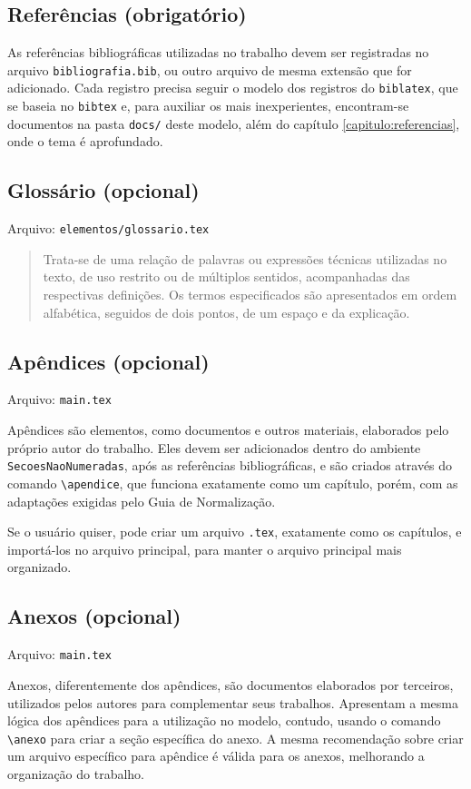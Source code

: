 \subsection{Referências (obrigatório)}
    As referências bibliográficas utilizadas no trabalho devem ser registradas no arquivo \texttt{bibliografia.bib}, ou outro arquivo de mesma extensão que for adicionado. Cada registro precisa seguir o modelo dos registros do \texttt{biblatex}, que se baseia no \texttt{bibtex} e, para auxiliar os mais inexperientes, encontram-se documentos na pasta \texttt{docs/} deste modelo, além do capítulo \ref{capitulo:referencias}, onde o tema é aprofundado.

\subsection{Glossário (opcional)}
    Arquivo: \texttt{elementos/glossario.tex}
    
    \blockcquote[p. 33]{livro:iffar-guia-normalizacao-2022}{Trata-se de uma relação de palavras ou expressões técnicas utilizadas no texto, de uso restrito ou de múltiplos sentidos, acompanhadas das respectivas definições. Os termos especificados são apresentados em ordem alfabética, seguidos de dois pontos, de um espaço e da
    explicação.}

\subsection{Apêndices (opcional)}
    Arquivo: \texttt{main.tex}
    
    Apêndices são elementos, como documentos e outros materiais, elaborados pelo próprio autor do trabalho. Eles devem ser adicionados dentro do ambiente \texttt{SecoesNaoNumeradas}, após as referências bibliográficas, e são criados através do comando \verb|\apendice|, que funciona exatamente como um capítulo, porém, com as adaptações exigidas pelo Guia de Normalização.

    Se o usuário quiser, pode criar um arquivo \texttt{.tex}, exatamente como os capítulos, e importá-los no arquivo principal, para manter o arquivo principal mais organizado.

\subsection{Anexos (opcional)}
    Arquivo: \texttt{main.tex}
    
    Anexos, diferentemente dos apêndices, são documentos elaborados por terceiros, utilizados pelos autores para complementar seus trabalhos. Apresentam a mesma lógica dos apêndices para a utilização no modelo, contudo, usando o comando \verb|\anexo| para criar a seção específica do anexo. A mesma recomendação sobre criar um arquivo específico para apêndice é válida para os anexos, melhorando a organização do trabalho.

